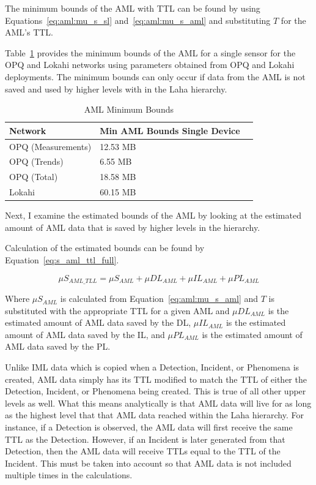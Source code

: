 The minimum bounds of the AML with TTL can be found by using Equations~\ref{eq:aml:mu_s_sl} and~\ref{eq:aml:mu_s_aml} and substituting $T$ for the AML's TTL.

Table~\ref{table:ttls_aml_min} provides the minimum bounds of the AML for a single sensor for the OPQ and Lokahi networks using parameters obtained from OPQ and Lokahi deployments. The minimum bounds can only occur if data from the AML is not saved and used by higher levels with in the Laha hierarchy.

\begin{table}[H]
	\centering
	\caption{AML Minimum Bounds}
	\begin{tabularx}{\textwidth}{Xll}
		\toprule
		\textbf{Network} & \textbf{Min AML Bounds Single Device} \\
		\midrule
		OPQ (Measurements) & 12.53 MB \\
		OPQ (Trends) & 6.55 MB \\
		OPQ (Total) & 18.58 MB \\
		Lokahi & 60.15 MB \\
		\bottomrule
	\end{tabularx}
	\label{table:ttls_aml_min}
\end{table}

Next, I examine the estimated bounds of the AML by looking at the estimated amount of AML data that is saved by higher levels in the hierarchy.

Calculation of the estimated bounds can be found by Equation~\ref{eq:s_aml_ttl_full}.

\begin{equation}\label{eq:s_aml_ttl_full}
	\mu S_{AML\_TLL} = \mu S_{AML} + \mu DL_{AML} + \mu IL_{AML} + \mu PL_{AML}
\end{equation}

Where $\mu S_{AML}$ is calculated from Equation~\ref{eq:aml:mu_s_aml} and $T$ is substituted with the appropriate TTL for a given AML and $\mu DL_{AML}$ is the estimated amount of AML data saved by the DL, $\mu IL_{AML}$ is the estimated amount of AML data saved by the IL, and $\mu PL_{AML}$ is the estimated amount of AML data saved by the PL\@.

Unlike IML data which is copied when a Detection, Incident, or Phenomena is created, AML data simply has its TTL modified to match the TTL of either the Detection, Incident, or Phenomena being created. This is true of all other upper levels as well. What this means analytically is that AML data will live for as long as the highest level that that AML data reached within the Laha hierarchy. For instance, if a Detection is observed, the AML data will first receive the same TTL as the Detection. However, if an Incident is later generated from that Detection, then the AML data will receive TTLs equal to the TTL of the Incident. This must be taken into account so that AML data is not included multiple times in the calculations.


